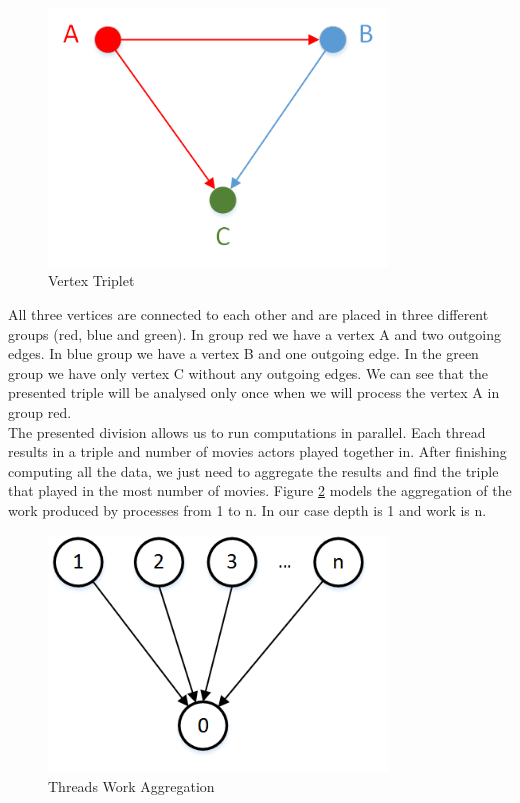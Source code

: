 \begin{figure}[ht!]
\centering
\includegraphics[width=90mm]{resources/triplet.png}
\caption{Vertex Triplet}
\label{triplet}
\end{figure}

All three vertices are connected to each other and are placed in three different groups (red, blue and green). In group red we have a vertex A and two outgoing edges. In blue group we have a vertex B and one outgoing edge. In the green group we have only vertex C without any outgoing edges. We can see that the presented triple will be analysed only once when we will process the vertex A in group red.
\\
The presented division allows us to run computations in parallel. Each thread results in a triple and number of movies actors played together in. After finishing computing all the data, we just need to aggregate the results and find the triple that played in the most number of movies. Figure \ref{threads} models the aggregation of the work produced by processes from 1 to n. In our case depth is 1 and work is n.


\begin{figure}[ht!]
\centering
\includegraphics[width=90mm]{resources/threads.png}
\caption{Threads Work Aggregation}
\label{threads}
\end{figure}


